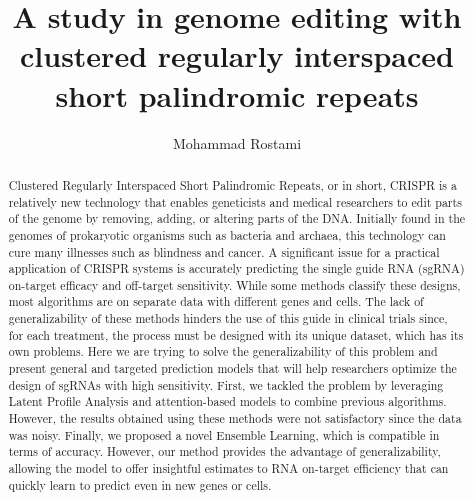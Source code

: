 \documentclass[12pt,a4paper,BCOR=.7cm,headsepline,bibliography=totoc]{report}
\begin{document}
\printindex
\begin{latin}
\begin{abstract}
Clustered Regularly Interspaced Short Palindromic Repeats, or in short, CRISPR is a relatively new
technology that enables geneticists and medical researchers to edit parts of the genome by removing,
adding, or altering parts of the DNA. Initially found in the genomes of prokaryotic organisms such as
bacteria and archaea, this technology can cure many illnesses such as blindness and cancer. A significant
issue for a practical application of CRISPR systems is accurately predicting the single guide RNA
(sgRNA) on-target efficacy and off-target sensitivity. While some methods classify these designs, most
algorithms are on separate data with different genes and cells. The lack of generalizability of these methods
hinders the use of this guide in clinical trials since, for each treatment, the process must be designed
with its unique dataset, which has its own problems. Here we are trying to solve the generalizability
of this problem and present general and targeted prediction models that will help researchers optimize
the design of sgRNAs with high sensitivity. First, we tackled the problem by leveraging Latent Profile
Analysis and attention-based models to combine previous algorithms. However, the results obtained
using these methods were not satisfactory since the data was noisy. Finally,
we proposed a novel Ensemble Learning, which is compatible in terms of accuracy. However, our
method provides the advantage of generalizability, allowing the model to offer insightful estimates to
RNA on-target efficiency that can quickly learn to predict even in new genes or cells.
\end{abstract}
\end{latin}

\subject{‌Applied Mathematics}
\author{Mohammad Rostami}
\title{A study in genome editing with clustered regularly interspaced short palindromic repeats}
\date{\latintoday}
\makethesisenglishtitle
\end{document}

